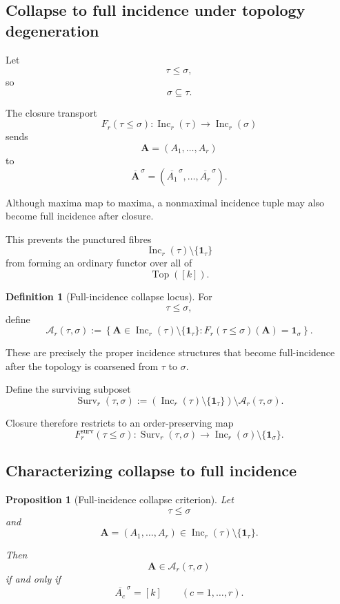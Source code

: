 \documentclass[11pt]{article}
\theoremstyle{plain}
\newtheorem{proposition}[theorem]{Proposition}
\theoremstyle{definition}
\newtheorem{definition}[theorem]{Definition}
\begin{document}
\subsection{Collapse to full incidence under topology degeneration}
\label{subsec:vertical-annihilation}

Let
\[
\tau\leq\sigma,
\]
so
\[
\sigma\subseteq\tau.
\]

The closure transport
\[
F_r(\tau\leq\sigma):
\operatorname{Inc}_r(\tau)
\longrightarrow
\operatorname{Inc}_r(\sigma)
\]
sends
\[
\mathbf A=(A_1,\ldots,A_r)
\]
to
\[
\overline{\mathbf A}^{\,\sigma}
=
\left(
\overline{A_1}^{\,\sigma},
\ldots,
\overline{A_r}^{\,\sigma}
\right).
\]

Although maxima map to maxima, a nonmaximal incidence tuple may also
become full incidence after closure.

This prevents the punctured fibres
\[
\operatorname{Inc}_r(\tau)\setminus\{\mathbf1_\tau\}
\]
from forming an ordinary functor over all of
\[
\operatorname{Top}([k]).
\]

\begin{definition}[Full-incidence collapse locus]
\label{def:vertical-annihilation}
For
\[
\tau\leq\sigma,
\]
define
\[
\mathcal A_r(\tau,\sigma)
:=
\left\{
\mathbf A\in
\operatorname{Inc}_r(\tau)\setminus\{\mathbf1_\tau\}:
F_r(\tau\leq\sigma)(\mathbf A)
=
\mathbf1_\sigma
\right\}.
\]
\end{definition}

These are precisely the proper incidence structures that become
full-incidence after the topology is coarsened from $\tau$ to $\sigma$.

Define the surviving subposet
\[
\operatorname{Surv}_r(\tau,\sigma)
:=
\left(
\operatorname{Inc}_r(\tau)\setminus\{\mathbf1_\tau\}
\right)
\setminus
\mathcal A_r(\tau,\sigma).
\]

Closure therefore restricts to an order-preserving map
\[
F_r^{\mathrm{surv}}(\tau\leq\sigma):
\operatorname{Surv}_r(\tau,\sigma)
\longrightarrow
\operatorname{Inc}_r(\sigma)
\setminus\{\mathbf1_\sigma\}.
\]

\subsection{Characterizing collapse to full incidence}
\label{subsec:annihilation-criterion}


\begin{proposition}[Full-incidence collapse criterion]
\label{prop:annihilation-criterion}
Let
\[
\tau\leq\sigma
\]
and
\[
\mathbf A=(A_1,\ldots,A_r)
\in
\operatorname{Inc}_r(\tau)
\setminus\{\mathbf1_\tau\}.
\]

Then
\[
\mathbf A\in\mathcal A_r(\tau,\sigma)
\]
if and only if
\[
\overline{A_c}^{\,\sigma}
=
[k]
\qquad
(c=1,\ldots,r).
\]
\end{proposition}
\end{document}
